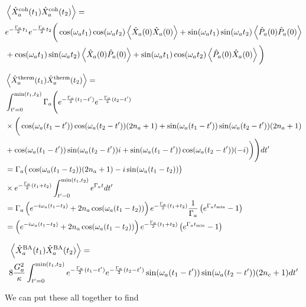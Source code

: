 \documentclass[12pt]{article}
\begin{document}
\begin{align}
&\Braket{\hat{X}^{\text{coh}}_a(t_1)\hat{X}^{\text{coh}}_a(t_2)} =\\ 
&e^{-\frac{\Gamma_a}{2} t_1}e^{-\frac{\Gamma_a}{2} t_2}\bigg(\cos(\omega_a t_1)\cos(\omega_a t_2)\Braket{\hat{X}_a(0)\hat{X}_a(0)} + \sin(\omega_a t_1)\sin(\omega_a t_2)\Braket{\hat{P}_a(0)\hat{P}_a(0)}\\
&+ \cos(\omega_a t_1)\sin(\omega_a t_2)\Braket{\hat{X}_a(0)\hat{P}_a(0)} + \sin(\omega_a t_1)\cos(\omega_a t_2)\Braket{\hat{P}_a(0)\hat{X}_a(0)} \bigg)\\
\end{align}

\begin{align}
&\Braket{\hat{X}_a^{\text{therm}}(t_1)\hat{X}_a^{\text{therm}}(t_2)} =\\
&\int_{t'=0}^{\text{min}(t_1,t_2)}\Gamma_a \Bigg( e^{-\frac{\Gamma_a}{2}(t_1-t')}e^{-\frac{\Gamma_a}{2}(t_2-t')}\\
&\times \bigg(\cos(\omega_a (t_1-t'))\cos(\omega_a (t_2-t'))(2n_a+1) + \sin(\omega_a (t_1-t'))\sin(\omega_a (t_2-t'))(2n_a+1)\\
&+ \cos(\omega_a (t_1-t'))\sin(\omega_a (t_2-t'))i+ \sin(\omega_a (t_1-t'))\cos(\omega_a (t_2-t'))(-i) \bigg) \Bigg)dt'\\
&= \Gamma_a\big(\cos(\omega_a(t_1-t_2))(2n_a+1) -i\sin(\omega_a(t_1-t_2))\big)\\
&\times e^{-\frac{\Gamma_a}{2}(t_1+t_2)}\int_{t'=0}^{\text{min}(t_1,t_2)} e^{\Gamma_a t} dt'\\
&= \Gamma_a \left(e^{-i\omega_a(t_1-t_2)} + 2n_a \cos(\omega_a(t_1-t_2))\right)e^{-\frac{\Gamma_a}{2}(t_1+t_2)} \frac{1}{\Gamma_a}\left(e^{\Gamma_a t_{\text{min}}} - 1\right)\\
&= \left(e^{-i\omega_a(t_1-t_2)} + 2n_a \cos(\omega_a(t_1-t_2))\right)e^{-\frac{\Gamma_a}{2}(t_1+t_2)}\left(e^{\Gamma_a t_{\text{min}}} - 1\right)\\
\end{align}

\begin{align}
&\Braket{\hat{X}_a^{\text{BA}}(t_1)\hat{X}_a^{\text{BA}}(t_2)} =\\
&8 \frac{G_a^2}{\kappa} \int_{t'=0}^{\text{min}(t_1,t_2)} e^{-\frac{\Gamma_a}{2}(t_1-t')}e^{-\frac{\Gamma_a}{2}(t_2-t')}\sin(\omega_a(t_1-t'))\sin(\omega_a(t_2-t'))(2n_c+1) dt'
\end{align}

We can put these all together to find
\end{document}
